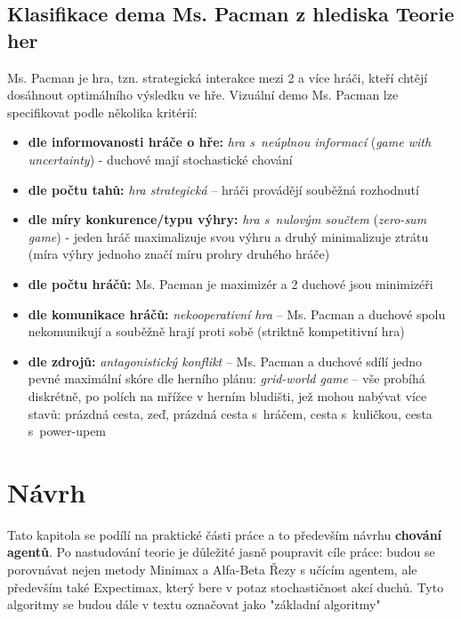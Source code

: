 \section{Klasifikace dema Ms. Pacman z hlediska Teorie her}
Ms. Pacman je hra, tzn. strategická interakce mezi 2 a více hráči, kteří chtějí dosáhnout optimálního výsledku ve hře.
Vizuální demo Ms. Pacman lze specifikovat podle několika kritérií:
\begin{itemize}
\item \textbf{dle informovanosti hráče o hře:} \textit{hra s neúplnou informací} (\textit{game with uncertainty}) - duchové mají stochastické chování
\item \textbf{dle počtu tahů:} \textit{hra strategická} – hráči provádějí souběžná rozhodnutí
\item \textbf{dle míry konkurence/typu výhry:} \textit{hra s nulovým součtem} (\textit{zero-sum game})  - jeden hráč maximalizuje svou výhru a druhý minimalizuje ztrátu (míra výhry jednoho značí míru prohry druhého hráče)
\item \textbf{dle počtu hráčů:} Ms. Pacman je maximizér a 2 duchové jsou minimizéři
\item \textbf{dle komunikace hráčů:} \textit{nekooperativní hra} – Ms. Pacman a duchové spolu nekomunikují a souběžně hrají proti sobě (striktně kompetitivní hra)
\item \textbf{dle zdrojů:} \textit{antagonistický konflikt} – Ms. Pacman a duchové sdílí jedno pevné maximální skóre
dle herního plánu: \textit{grid-world game} – vše probíhá diskrétně, po polích na mřížce v herním bludišti, jež mohou nabývat více stavů: prázdná cesta, zeď, prázdná cesta s hráčem, cesta s kuličkou, cesta s power-upem
\end{itemize}
\chapter{Návrh}
\label{navrh}
Tato kapitola se podílí na praktické části práce a to především návrhu \textbf{chování agentů}.
Po nastudování teorie je důležité jasně poupravit cíle práce: budou se porovnávat nejen metody Minimax a Alfa-Beta Řezy s učícím agentem, ale především také Expectimax, který bere v potaz stochastičnost akcí duchů. Tyto algoritmy se budou dále v textu označovat jako "základní algoritmy"

